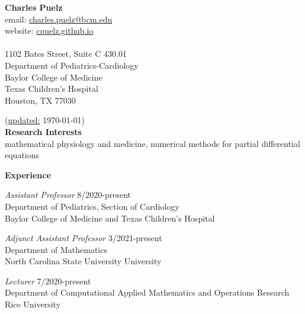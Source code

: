 \documentclass{article} %
\begin{document}
\noindent
{\Large{\bf Charles Puelz}} \\

\noindent
email: \url{charles.puelz@bcm.edu} \\
website: \url{cpuelz.github.io} \\ \\
1102 Bates Street, Suite C 430.01 \\
Department of Pediatrics-Cardiology \\ 
Baylor College of Medicine \\
Texas Children's Hospital \\
Houston, TX 77030

\vspace{0.2cm}
\noindent
{\small (\url{updated:} \today)} \\


\noindent
{\bf \large Research Interests} \\

\indent
mathematical physiology and medicine, numerical methods for partial differential equations

\vspace{0.5cm}
\noindent
{\bf \large Experience}

\vspace{0.25cm}
\indent 
{\em Assistant Professor}  \hspace*{\fill} 8/2020-present \\
\indent
Department of Pediatrics, Section of Cardiology \\
\indent Baylor College of Medicine and Texas Children's Hospital

\vspace{0.1cm}

\indent 
{\em Adjunct Assistant Professor}  \hspace*{\fill} 3/2021-present  \\
\indent
Department of Mathematics \\
\indent North Carolina State University University

\vspace{0.1cm}
\indent
{\em Lecturer} \hspace*{\fill} 7/2020-present \\
\indent
Department of Computational Applied Mathematics and Operations Research \\
\indent Rice University 
\end{document}

